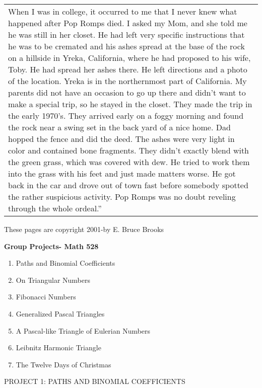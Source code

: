 \documentclass[10pt,letter]{article}
\renewenvironment{quote}
  {\begin{tabular}{|p{13cm}}}
  {\end{tabular}}
\begin{document}
\begin{quote}
When I was in college, it occurred to me that I never knew what happened
after Pop Romps died. I asked my Mom, and she told me he was still in
her closet. He had left very specific instructions that he was to be
cremated and his ashes spread at the base of the rock on a hillside in
Yreka, California, where he had proposed to his wife, Toby. He had
spread her ashes there. He left directions and a photo of the location.
Yreka is in the northernmost part of California. My parents did not have
an occasion to go up there and didn't want to make a special trip, so he
stayed in the closet. They made the trip in the early 1970's. They
arrived early on a foggy morning and found the rock near a swing set in
the back yard of a nice home. Dad hopped the fence and did the deed. The
ashes were very light in color and contained bone fragments. They didn't
exactly blend with the green grass, which was covered with dew. He tried
to work them into the grass with his feet and just made matters worse.
He got back in the car and drove out of town fast before somebody
spotted the rather suspicious activity. Pop Romps was no doubt reveling
through the whole ordeal.''

\end{quote}

These pages are copyright 2001-by E. Bruce Brooks

\textbf{Group Projects- Math 528}

\begin{enumerate}
\def\labelenumi{\arabic{enumi}.}

\item
  Paths and Binomial Coefficients
\item
  On Triangular Numbers
\item
  Fibonacci Numbers
\item
  Generalized Pascal Triangles
\item
  A Pascal-like Triangle of Eulerian Numbers
\item
  Leibnitz Harmonic Triangle
\item
  The Twelve Days of Christmas

\end{enumerate}

PROJECT 1: PATHS AND BINOMIAL COEFFICIENTS
\end{document}
